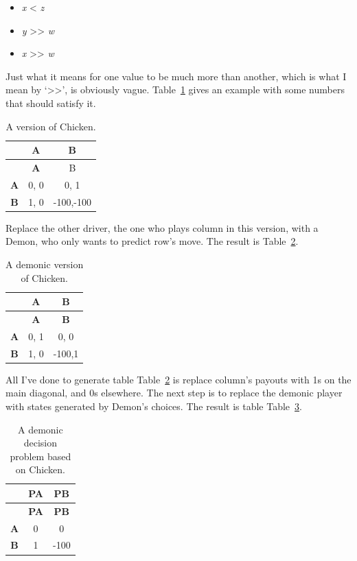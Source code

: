 \documentclass[
  12pt,
  letterpaper,
  DIV=11,
  numbers=noendperiod]{scrreprt}
\providecommand{\tightlist}{%
  \setlength{\itemsep}{0pt}\setlength{\parskip}{0pt}}\usepackage{longtable,booktabs,array}
\begin{document}
\begin{itemize}
\tightlist
\item
  \emph{x} \textless{} \emph{z}
\item
  \emph{y} \textgreater\textgreater{} \emph{w}
\item
  \emph{x} \textgreater\textgreater{} \emph{w}
\end{itemize}

Just what it means for one value to be much more than another, which is
what I mean by `\textgreater\textgreater{}', is obviously vague.
Table~\ref{tbl-basic-chicken} gives an example with some numbers that
should satisfy it.

\hypertarget{tbl-basic-chicken}{}
\begin{longtable}[]{@{}ccc@{}}
\caption{\label{tbl-basic-chicken}A version of Chicken.}\tabularnewline
\toprule\noalign{}
& \textbf{A} & B \\
\midrule\noalign{}
\endfirsthead
\toprule\noalign{}
& \textbf{A} & B \\
\midrule\noalign{}
\endhead
\bottomrule\noalign{}
\endlastfoot
\textbf{A} & 0, 0 & 0, 1 \\
\textbf{B} & 1, 0 & -100,-100 \\
\end{longtable}

Replace the other driver, the one who plays column in this version, with
a Demon, who only wants to predict row's move. The result is
Table~\ref{tbl-demon-chicken}.

\hypertarget{tbl-demon-chicken}{}
\begin{longtable}[]{@{}ccc@{}}
\caption{\label{tbl-demon-chicken}A demonic version of
Chicken.}\tabularnewline
\toprule\noalign{}
& \textbf{A} & \textbf{B} \\
\midrule\noalign{}
\endfirsthead
\toprule\noalign{}
& \textbf{A} & \textbf{B} \\
\midrule\noalign{}
\endhead
\bottomrule\noalign{}
\endlastfoot
\textbf{A} & 0, 1 & 0, 0 \\
\textbf{B} & 1, 0 & -100,1 \\
\end{longtable}

All I've done to generate table Table~\ref{tbl-demon-chicken} is replace
column's payouts with 1s on the main diagonal, and 0s elsewhere. The
next step is to replace the demonic player with states generated by
Demon's choices. The result is table Table~\ref{tbl-egan-game}.

\hypertarget{tbl-egan-game}{}
\begin{longtable}[]{@{}ccc@{}}
\caption{\label{tbl-egan-game}A demonic decision problem based on
Chicken.}\tabularnewline
\toprule\noalign{}
& \textbf{PA} & \textbf{PB} \\
\midrule\noalign{}
\endfirsthead
\toprule\noalign{}
& \textbf{PA} & \textbf{PB} \\
\midrule\noalign{}
\endhead
\bottomrule\noalign{}
\endlastfoot
\textbf{A} & 0 & 0 \\
\textbf{B} & 1 & -100 \\
\end{longtable}
\end{document}

